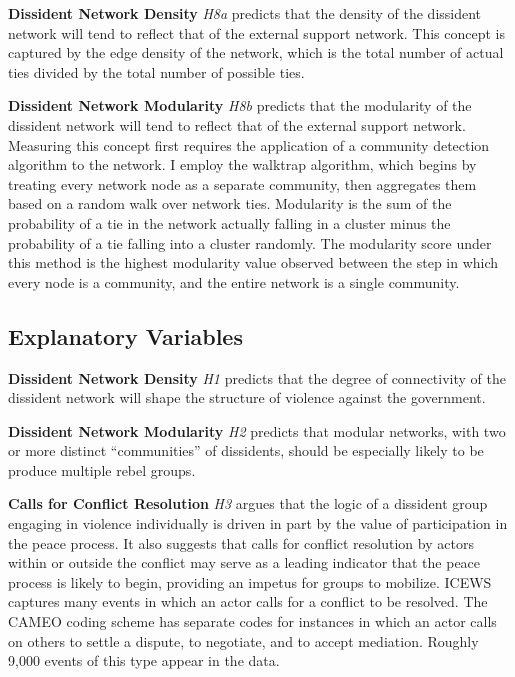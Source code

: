 \textbf{Dissident Network Density} \textit{H8a} predicts that the density of the dissident network will tend to reflect that of the external support network. This concept is captured by the edge density of the network, which is the total number of actual ties divided by the total number of possible ties. 

\textbf{Dissident Network Modularity} \textit{H8b} predicts that the modularity of the dissident network will tend to reflect that of the external support network. Measuring this concept first requires the application of a community detection algorithm to the network. I employ the walktrap algorithm, which begins by treating every network node as a separate community, then aggregates them based on a random walk over network ties. Modularity is the sum of the probability of a tie in the network actually falling in a cluster minus the probability of a tie falling into a cluster randomly. The modularity score under this method is the highest modularity value observed between the step in which every node is a community, and the entire network is a single community. 

\subsection{Explanatory Variables} 

\textbf{Dissident Network Density} \textit{H1} predicts that the degree of connectivity of the dissident network will shape the structure of violence against the government. 

\textbf{Dissident Network Modularity} \textit{H2} predicts that modular networks, with two or more distinct ``communities'' of dissidents, should be especially likely to be produce multiple rebel groups.

\textbf{Calls for Conflict Resolution} \textit{H3} argues that the logic of a dissident group engaging in violence individually is driven in part by the value of participation in the peace process. It also suggests that calls for conflict resolution by actors within or outside the conflict may serve as a leading indicator that the peace process is likely to begin, providing an impetus for groups to mobilize. ICEWS captures many events in which an actor calls for a conflict to be resolved. The CAMEO coding scheme has separate codes for instances in which an actor calls on others to settle a dispute, to negotiate, and to accept mediation. Roughly 9,000 events of this type appear in the data. 

